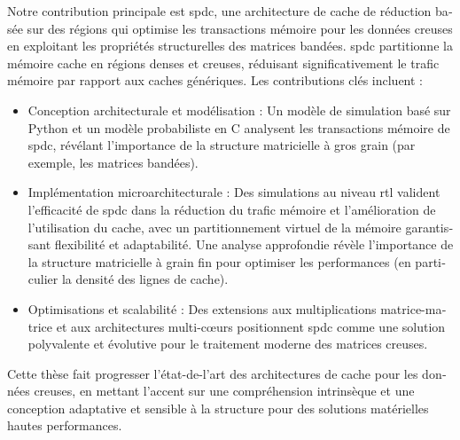 \begin{otherlanguage}{french}
Notre contribution principale est \acrlong{spdc}, une architecture de cache de réduction basée sur des régions qui optimise les transactions mémoire pour les données creuses en exploitant les propriétés structurelles des matrices bandées.
\acrlong{spdc} partitionne la mémoire cache en régions denses et creuses, réduisant significativement le trafic mémoire par rapport aux caches génériques.
Les contributions clés incluent :
\begin{itemize}
    \item Conception architecturale et modélisation : Un modèle de simulation basé sur Python et un modèle probabiliste en C analysent les transactions mémoire de \acrlong{spdc}, révélant l'importance de la structure matricielle à gros grain (par exemple, les matrices bandées).
    \item Implémentation microarchitecturale : Des simulations au niveau \acrshort{rtl} valident l'efficacité de \acrlong{spdc} dans la réduction du trafic mémoire et l'amélioration de l'utilisation du cache, avec un partitionnement virtuel de la mémoire garantissant flexibilité et adaptabilité.
    Une analyse approfondie révèle l'importance de la structure matricielle à grain fin pour optimiser les performances (en particulier la densité des lignes de cache).
    \item Optimisations et scalabilité : Des extensions aux multiplications matrice-matrice et aux architectures multi-c\oe{}urs positionnent \acrlong{spdc} comme une solution polyvalente et évolutive pour le traitement moderne des matrices creuses.
\end{itemize}

Cette thèse fait progresser l'état-de-l'art des architectures de cache pour les données creuses, en mettant l'accent sur une compréhension intrinsèque et une conception adaptative et sensible à la structure pour des solutions matérielles hautes performances.


\end{otherlanguage}
\cleardoublepage %
\adjustmtc